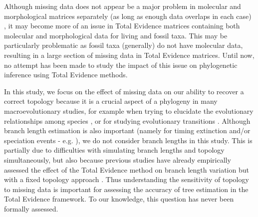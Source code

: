\documentclass[12pt,letterpaper]{article}
\begin{document}
Although missing data does not appear be a major problem in molecular and morphological matrices separately (as long as enough data overlaps in each case) \citep{wiensmissing2003,wiensmissing2006,wiensmissing2008,rouresite-specific2011,pattinsonphylogeny2014}, it may become more of an issue in Total Evidence matrices containing both molecular and morphological data for living and fossil taxa. This may be particularly problematic as fossil taxa (generally) do not have molecular data, resulting in a large section of missing data in Total Evidence matrices. Until now, no attempt has been made to study the impact of this issue on phylogenetic inference using Total Evidence methods.

In this study, we focus on the effect of missing data on our ability to recover a correct topology because it is a crucial aspect of a phylogeny in many macroevolutionary studies, for example when trying to elucidate the evolutionary relationships among species \citep[e.g.][]{meredithimpacts2011,jetzthe2012}, or for studying evolutionary transitions \citep[e.g.][]{}. %
Although branch length estimation is also important (namely for timing extinction and/or speciation events - e.g. \citealt{ronquista2012}), we do not consider branch lengths in this study. This is partially due to difficulties with simulating branch lengths and topology simultaneously,
but also because previous studies have already empirically assessed the effect of the Total Evidence method on branch length variation but with a fixed topology approach \citep{ronquista2012,schragocombining2013,slaterphylogenetic2013,beckancient2014}.
Thus understanding the sensitivity of topology to missing data is important for assessing the accuracy of tree estimation in the Total Evidence framework. To our knowledge, this question has never been formally assessed.
\end{document}
